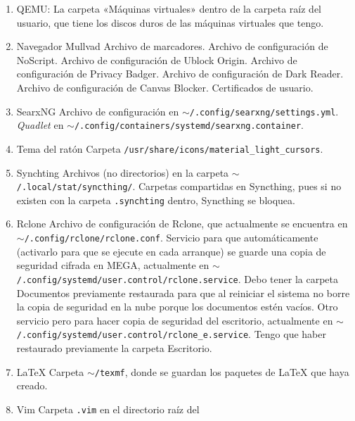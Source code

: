\documentclass{article}
\begin{document}
    \begin{enumerate}
    	   \item QEMU:
    	           \subitem La carpeta «Máquinas virtuales» dentro de la carpeta
		   raíz del usuario, que tiene los discos duros de las máquinas
		   virtuales que tengo.
    	   \item Navegador Mullvad
    	   	   \subitem Archivo de marcadores.
    	   	   \subitem Archivo de configuración de NoScript.
    	   	   \subitem Archivo de configuración de Ublock Origin.
    	   	   \subitem Archivo de configuración de Privacy Badger.
    	   	   \subitem Archivo de configuración de Dark Reader.
    	   	   \subitem Archivo de configuración de Canvas Blocker.
               \subitem Certificados de usuario.
    	   \item SearxNG
    	   	   \subitem Archivo de configuración en
		   \texttt{$\sim$/.config/searxng/settings.yml}.
		   \subitem \textit{Quadlet} en
		   \texttt{$\sim$/.config/containers/systemd/searxng.container}.
    	   \item Tema del ratón
    	           \subitem Carpeta
		   \texttt{/usr/share/icons/material\_light\_cursors}.
	   \item Synchting
		   \subitem Archivos (no directorios) en la carpeta
		   \texttt{$\sim$/.local/stat/syncthing/}.
		   \subitem Carpetas compartidas en Syncthing, pues si no
		   existen con la carpeta \texttt{.synchting} dentro, Syncthing
		   se bloquea.
	   \item Rclone
		   \subitem Archivo de configuración de Rclone, que actualmente
		   se encuentra en
		   \texttt{$\sim$/.config/r\-clone/\-rclone.conf}.
		   \subitem Servicio para que automáticamente (activarlo para
		   que se ejecute en cada arranque) se guarde una copia de
		   seguridad cifrada en MEGA, actualmente en
		   \texttt{$\sim$/.config/systemd/user.control/rclone.service}. Debo tener la
		   carpeta Documentos previamente restaurada para que al
		   reiniciar el sistema no borre la copia de seguridad en la
		   nube porque los documentos estén vacíos.
		   \subitem Otro servicio pero para hacer copia de seguridad del
		   escritorio, actualmente en
		   \texttt{$\sim$/.config/systemd/user.control/rclone\_e.service}. Tengo que
		   haber restaurado previamente la carpeta Escritorio.
	   \item \LaTeX{}
		   \subitem Carpeta \texttt{$\sim$/texmf}, donde se guardan los
		   paquetes de \LaTeX{} que haya creado.
	   \item Vim
		   \subitem Carpeta \texttt{.vim} en el directorio raíz del

\end{enumerate}
\end{document}
